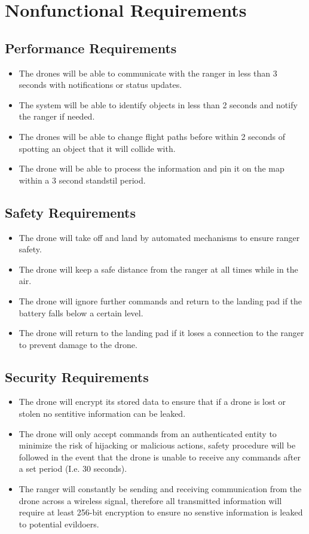 \chapter{Nonfunctional Requirements}

\section{Performance Requirements}
\begin{itemize}
	\item The drones will be able to communicate with the ranger in less than 3 seconds with notifications or status updates.
	\item The system will be able to identify objects in less than 2 seconds and notify the ranger if needed.
	\item The drones will be able to change flight paths before within 2 seconds of spotting an object that it will collide with.
	\item The drone will be able to process the information and pin it on the map within a 3 second standstil period.
\end{itemize}

\section{Safety Requirements}
\begin{itemize}
	\item The drone will take off and land by automated mechanisms to ensure ranger safety.
	\item The drone will keep a safe distance from the ranger at all times while in the air.
	\item The drone will ignore further commands and return to the landing pad if the battery falls below a certain level.
	\item The drone will return to the landing pad if it loses a connection to the ranger to prevent damage to the drone.
\end{itemize}

\section{Security Requirements}
\begin{itemize}
	\item The drone will encrypt its stored data to ensure that if a drone is lost or stolen no sentitive information can be leaked.
	\item The drone will only accept commands from an authenticated entity to minimize the risk of hijacking or malicious actions, safety procedure will be followed in the event that the drone is unable to receive any commands after a set period (I.e. 30 seconds).
	\item The ranger will constantly be sending and receiving communication from the drone across a wireless signal, therefore all transmitted information will require at least 256-bit encryption to ensure no senstive information is leaked to potential evildoers.
\end{itemize}

